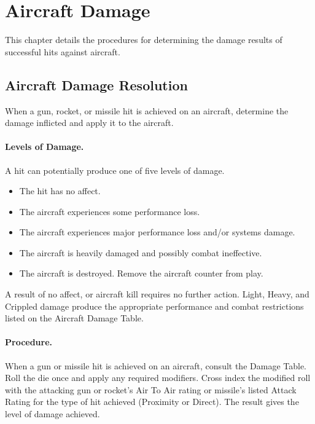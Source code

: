 \section{Aircraft Damage}

This chapter details the procedures for determining the damage results of successful hits against aircraft.

\subsection{Aircraft Damage Resolution}

When a gun, rocket, or missile hit is achieved on an aircraft, determine the damage inflicted and apply it to the aircraft.

\paragraph{Levels of Damage.} A hit can potentially produce one of five levels of damage.

\begin{itemize}

    \item{} The hit has no affect.

    \item{} The aircraft experiences some performance loss.
    
    \item{} The aircraft experiences major performance loss and/or systems damage.

    \item{} The aircraft is heavily damaged and possibly combat ineffective.
    
    \item{} The aircraft is destroyed. Remove the aircraft counter from play.

\end{itemize}

A result of no affect, or aircraft kill requires no further action. Light, Heavy, and Crippled damage produce the appropriate performance and combat restrictions listed on the Aircraft Damage Table.

\paragraph{Procedure.} When a gun or missile hit is achieved on an aircraft, consult the Damage Table. Roll the die once and apply any required modifiers. Cross index the modified roll with the attacking gun or rocket's Air To Air rating or missile's listed Attack Rating for the type of hit achieved (Proximity or Direct). The result gives the level of damage achieved.

